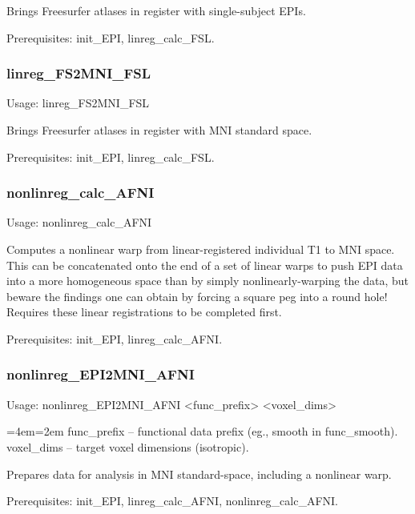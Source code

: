 \documentclass[final,titlepage,letterpaper,oneside,12pt]{article}
\renewcommand{\texttt}[2][BrickRed]{\textcolor{#1}{\ttfamily #2}}%
\newenvironment{blockquote}{%
  \par%
  \medskip
  \leftskip=4em\rightskip=2em%
  \noindent\ignorespaces}{%
  \par\medskip}
\begin{document}
\noindent Brings Freesurfer atlases in register with single-subject EPIs.

Prerequisites: \texttt{init\_EPI}, \texttt{linreg\_calc\_FSL}.

\subsubsection{linreg\_FS2MNI\_FSL}
Usage: \texttt{linreg\_FS2MNI\_FSL}

\noindent Brings Freesurfer atlases in register with MNI standard space.

Prerequisites: \texttt{init\_EPI}, \texttt{linreg\_calc\_FSL}.


\subsubsection{nonlinreg\_calc\_AFNI}
Usage: \texttt{nonlinreg\_calc\_AFNI}

\noindent Computes a nonlinear warp from linear-registered individual T1 to MNI space. This can be concatenated onto the end of a set of linear warps to push EPI data into a more homogeneous space than by simply nonlinearly-warping the data, but beware the findings one can obtain by forcing a square peg into a round hole! Requires these linear registrations to be completed first.

Prerequisites: \texttt{init\_EPI}, \texttt{linreg\_calc\_AFNI}.

\subsubsection{nonlinreg\_EPI2MNI\_AFNI}
Usage: \texttt{nonlinreg\_EPI2MNI\_AFNI <func\_prefix> <voxel\_dims>}

\begin{blockquote}
func\_prefix -- functional data prefix (eg., smooth in func\_smooth). \\
voxel\_dims -- target voxel dimensions (isotropic). \
\end{blockquote}

\noindent Prepares data for analysis in MNI standard-space, including a nonlinear warp.

Prerequisites: \texttt{init\_EPI}, \texttt{linreg\_calc\_AFNI}, \texttt{nonlinreg\_calc\_AFNI}.
\end{document}
